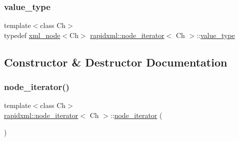 \subsubsection{\texorpdfstring{value\_type}{value\_type}}
{\footnotesize\ttfamily template$<$class Ch$>$ \\
typedef \mbox{\hyperlink{classrapidxml_1_1xml__node}{xml\+\_\+node}}$<$Ch$>$ \mbox{\hyperlink{classrapidxml_1_1node__iterator}{rapidxml\+::node\+\_\+iterator}}$<$ Ch $>$\+::\mbox{\hyperlink{classrapidxml_1_1node__iterator_ade6310119ed1f72c94830e006fac69b7}{value\+\_\+type}}}



\subsection{Constructor \& Destructor Documentation}
\mbox{\label{classrapidxml_1_1node__iterator_a4e1244b9e9e1d2b5129235806d1e31ad}} 
\subsubsection{\texorpdfstring{node\_iterator()}{node\_iterator()}\hspace{0.1cm}{\footnotesize\ttfamily [1/2]}}
{\footnotesize\ttfamily template$<$class Ch$>$ \\
\mbox{\hyperlink{classrapidxml_1_1node__iterator}{rapidxml\+::node\+\_\+iterator}}$<$ Ch $>$\+::\mbox{\hyperlink{classrapidxml_1_1node__iterator}{node\+\_\+iterator}} (\begin{DoxyParamCaption}{ }\end{DoxyParamCaption})\hspace{0.3cm}{\ttfamily [inline]}}

\mbox{\label{classrapidxml_1_1node__iterator_a94c3da59b54e4bd003e226cc35b3c266}} 
